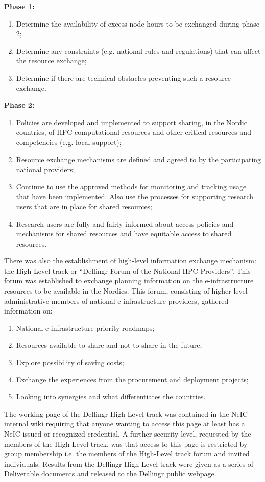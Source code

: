 \documentclass{article}
\newcommand{\dell}{Dellingr\xspace}
\newcommand{\einfra}{e-infrastructure\xspace}
\newcommand{\HLT}{High-Level track\xspace}
\begin{document}
{\bf Phase 1:}
\begin{enumerate}
\item Determine the availability of excess node hours to be exchanged during phase 2;
\item Determine any constraints (e.g. national rules and regulations) that can affect the resource exchange;
\item Determine if there are technical obstacles preventing such a resource exchange.
\end{enumerate}

{\bf Phase 2:}
\begin{enumerate}
\item Policies are developed and implemented to support sharing, in the Nordic countries, of HPC computational resources and other critical resources and competencies (e.g. local support);
\item Resource exchange mechanisms are defined and agreed to by the participating national providers;
\item Continue to use the approved methods for monitoring and tracking usage that have been implemented. Also use the processes for supporting research users that are in place for shared resources;
\item Research users are fully and fairly informed about access policies and mechanisms for shared resources and have equitable 
access to shared resources.
\end{enumerate}

There was also the establishment of high-level information exchange mechanism: the \HLT or ``\dell Forum of the National HPC Providers''.
This forum was established to exchange planning information on the \einfra resources to be available in the Nordics.
This forum, consisting of higher-level administrative members of national \einfra providers, gathered information on:
\begin{enumerate}
\item National \einfra priority roadmaps;
\item Resources available to share and not to share in the future;
\item Explore possibility of saving costs;
\item Exchange the experiences from the procurement and deployment projects;
\item Looking into synergies and what differentiates the countries.
\end{enumerate}
The working page of the \dell \HLT was contained in the NeIC internal wiki requiring that anyone wanting to access this page at least
has a NeIC-issued or recognized credential.
A further security level, requested by the members of the \HLT, was that access to this page is restricted by group membership i.e.
the members of the \HLT forum and invited individuals.
Results from the \dell \HLT were given as a series of Deliverable documents and released to the \dell public webpage.
\end{document}
